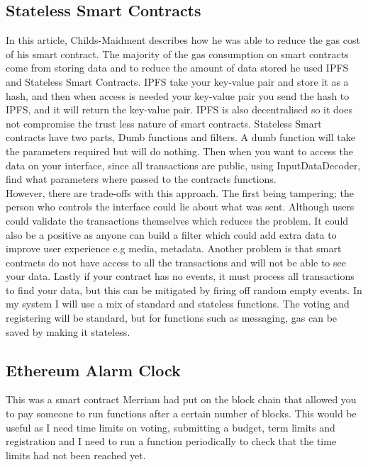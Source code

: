 \subsection{Stateless Smart Contracts \cite{Childs-Maidment:2016:pdflatex}}
In this article, Childs-Maidment describes how he was able to reduce the gas cost of his smart contract. The majority of the gas consumption on smart contracts come from storing data and to reduce the amount of data stored he used IPFS and Stateless Smart Contracts. IPFS take your key-value pair and store it as a hash, and then when access is needed your key-value pair you send the hash to IPFS, and it will return the key-value pair. IPFS is also decentralised so it does not compromise the trust less nature of smart contracts. Stateless Smart contracts have two parts, Dumb functions and filters. A dumb function will take the parameters required but will do nothing. Then when you want to access the data on your interface, since all transactions are public, using InputDataDecoder, find what parameters where passed to the contracts functions.  \\
However, there are trade-offs with this approach. The first being tampering; the person who controls the interface could lie about what was sent.  Although users could validate the transactions themselves which reduces the problem. It could also be a positive as anyone can build a filter which could add extra data to improve user experience e.g media, metadata. Another problem is that smart contracts do not have access to all the transactions and will not be able to see your data. Lastly if your contract has no events, it must process all transactions to find your data, but this can be mitigated by firing off random empty events. In my system I will use a mix of standard and stateless functions. The voting and registering will be standard, but for functions such as messaging, gas can be saved by making it stateless.
\subsection{Ethereum Alarm Clock  \cite{Merriam:2017:pdflatex}}
This was a smart contract Merriam had put on the block chain that allowed you to pay someone to run functions after a certain number of blocks. This would be useful as I need time limits on voting, submitting a budget, term limits and registration and I need to run a function periodically to check that the time limits had not been reached yet.

